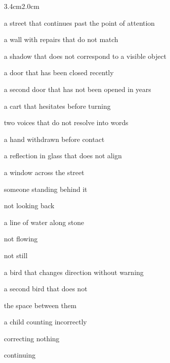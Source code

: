 \begin{adjustwidth}{3.4cm}{2.0cm}

\noindent a street that continues past the point of attention

\noindent a wall with repairs that do not match

\noindent a shadow that does not correspond to a visible object

\noindent {}

\noindent a door that has been closed recently

\noindent a second door that has not been opened in years

\noindent {}

\noindent a cart that hesitates before turning

\noindent two voices that do not resolve into words

\noindent a hand withdrawn before contact

\noindent {}

\noindent a reflection in glass that does not align

\noindent a window across the street

\noindent someone standing behind it

\noindent not looking back

\vspace{1em}

\noindent a line of water along stone

\noindent not flowing

\noindent not still

\noindent {}

\noindent a bird that changes direction without warning

\noindent a second bird that does not

\noindent the space between them

\vspace{1em}

\noindent {}

\noindent a child counting incorrectly

\noindent correcting nothing

\noindent continuing

\noindent {}

\vspace{1em}


\end{adjustwidth}
